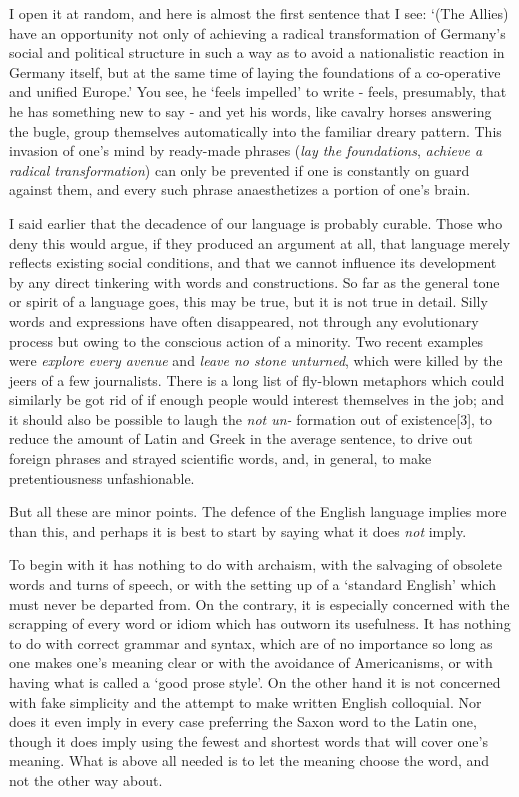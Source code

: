 I open it at random, and here is almost the first sentence that I see: ‘(The Allies) have an opportunity not only of achieving a radical transformation of Germany’s social and political structure in such a way as to avoid a nationalistic reaction in Germany itself, but at the same time of laying the foundations of a co-operative and unified Europe.’ You see, he ‘feels impelled’ to write - feels, presumably, that he has something new to say - and yet his words, like cavalry horses answering the bugle, group themselves automatically into the familiar dreary pattern. This invasion of one’s mind by ready-made phrases (\textit{lay the foundations}, \textit{achieve a radical transformation}) can only be prevented if one is constantly on guard against them, and every such phrase anaesthetizes a portion of one’s brain.\par

I said earlier that the decadence of our language is probably curable. Those who deny this would argue, if they produced an argument at all, that language merely reflects existing social conditions, and that we cannot influence its development by any direct tinkering with words and constructions. So far as the general tone or spirit of a language goes, this may be true, but it is not true in detail. Silly words and expressions have often disappeared, not through any evolutionary process but owing to the conscious action of a minority. Two recent examples were \textit{explore every avenue} and \textit{leave no stone unturned}, which were killed by the jeers of a few journalists. There is a long list of fly-blown metaphors which could similarly be got rid of if enough people would interest themselves in the job; and it should also be possible to laugh the \textit{not un-} formation out of existence[3], to reduce the amount of Latin and Greek in the average sentence, to drive out foreign phrases and strayed scientific words, and, in general, to make pretentiousness unfashionable.\par

But all these are minor points. The defence of the English language implies more than this, and perhaps it is best to start by saying what it does \textit{not }imply.\par

To begin with it has nothing to do with archaism, with the salvaging of obsolete words and turns of speech, or with the setting up of a ‘standard English’ which must never be departed from. On the contrary, it is especially concerned with the scrapping of every word or idiom which has outworn its usefulness. It has nothing to do with correct grammar and syntax, which are of no importance so long as one makes one’s meaning clear or with the avoidance of Americanisms, or with having what is called a ‘good prose style’. On the other hand it is not concerned with fake simplicity and the attempt to make written English colloquial. Nor does it even imply in every case preferring the Saxon word to the Latin one, though it does imply using the fewest and shortest words that will cover one’s meaning. What is above all needed is to let the meaning choose the word, and not the other way about.\par

